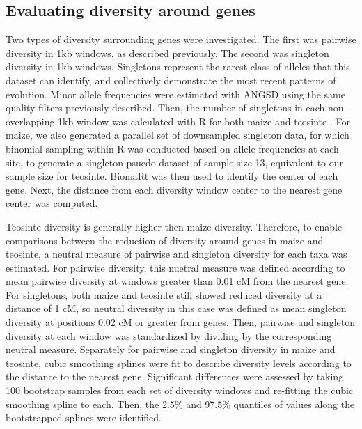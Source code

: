 \documentclass{pnastwo}
\begin{document}
\begin{article}
\begin{materials}
\subsection{Evaluating diversity around genes}
Two types of diversity surrounding genes were investigated. The first
was pairwise diversity in 1kb windows, as described previously. The
second was singleton diversity in 1kb windows. Singletons represent
the rarest class of alleles that this dataset can identify, and
collectively demonstrate the most recent patterns of evolution. Minor
allele frequencies were estimated with ANGSD \cite{korneliussen2014} using the
same quality filters previously described. Then, the number of
singletons in each non-overlapping 1kb window was calculated with R
for both maize and teosinte \cite{R2014}. For maize, we also generated a parallel set of downsampled
singleton data, for which binomial sampling within R was conducted
based on allele frequencies at each site, to generate a singleton
psuedo dataset of sample size 13, equivalent to our sample size for
teosinte. BiomaRt \cite{durinck2009, durinck2005} was then used to identify
the center of each gene. Next, the distance from each diversity window center
to the nearest gene center was computed.

Teosinte diversity is
generally higher then maize diversity. Therefore, to enable comparisons between
the reduction of diversity around genes in maize and teosinte, a
neutral measure of pairwise and singleton diversity for each taxa was
estimated. For pairwise diversity, this nuetral measure was defined according to
mean pairwise diversity at windows greater than 0.01 cM from the nearest
gene. For singletons, both maize and teosinte still showed reduced
diversity at a distance of 1 cM, so neutral diversity in this case was
defined as mean singleton diversity at positions 0.02 cM or greater
from genes. Then, pairwise and singleton diversity at each window was
standardized by dividing by the corresponding neutral
measure. Separately for pairwise and singleton diversity in maize and
teosinte, cubic smoothing splines were fit to
describe diversity levels according to the distance to the nearest
gene. Significant differences were assessed by taking 100 bootstrap
samples from each set of diversity windows and re-fitting the cubic smoothing spline to each. Then, the
2.5\% and 97.5\% quantiles of values along the bootstrapped splines
were identified.




\end{materials}
\end{article}
\end{document}
